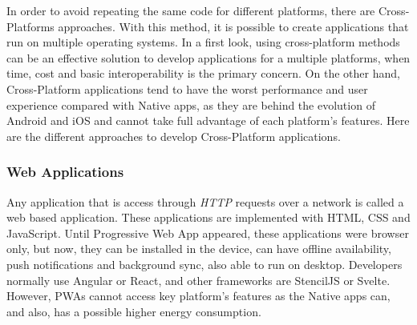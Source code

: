 In order to avoid repeating the same code for different platforms, there are Cross-Platforms approaches.
With this method, it is possible to create applications that run on multiple operating systems.
In a first look, using cross-platform methods can be an effective solution to develop applications for a multiple platforms, when time, cost and basic interoperability is the primary concern.
On the other hand, Cross-Platform applications tend to have the worst performance and user experience compared with Native apps, as they are behind the evolution of Android and iOS and cannot take full advantage of each platform's features\cite{Nagy2022}.
Here are the different approaches to develop Cross-Platform applications.

\subsubsection{Web Applications}

Any application that is access through \textit{HTTP} requests over a network is called a web based application.
These applications are implemented with HTML, CSS and JavaScript.
Until Progressive Web App appeared, these applications were browser only, but now, they can be installed in the device, can have offline availability, push notifications and background sync, also able to run on desktop.
Developers normally use Angular or React, and other frameworks are StencilJS or Svelte.
However, PWAs cannot access key platform's features as the Native apps can, and also, has a possible higher energy consumption.\cite{Huber2021}


















